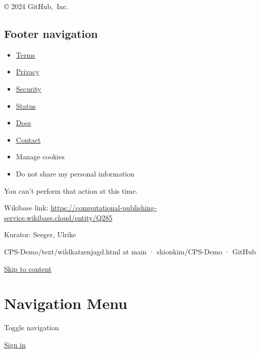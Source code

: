 \documentclass[
  letterpaper,
]{book}
\providecommand{\tightlist}{%
  \setlength{\itemsep}{0pt}\setlength{\parskip}{0pt}}\usepackage{longtable,booktabs,array}
\begin{document}
© 2024 GitHub,~Inc.

\subsection{Footer navigation}\label{footer-navigation-1}

\begin{itemize}
\tightlist
\item
  \href{https://docs.github.com/site-policy/github-terms/github-terms-of-service}{Terms}
\item
  \href{https://docs.github.com/site-policy/privacy-policies/github-privacy-statement}{Privacy}
\item
  \href{https://github.com/security}{Security}
\item
  \href{https://www.githubstatus.com/}{Status}
\item
  \href{https://docs.github.com/}{Docs}
\item
  \href{https://support.github.com?tags=dotcom-footer}{Contact}
\item
  Manage cookies
\item
  Do not share my personal information
\end{itemize}

You can't perform that action at this time.

Wikibase link:
\url{https://computational-publishing-service.wikibase.cloud/entity/Q285}

Kurator: Seeger, Ulrike

CPS-Demo/text/wildkatzenjagd.html at main · shionkim/CPS-Demo · GitHub

\hyperref[start-of-content]{Skip to content}

\section{Navigation Menu}\label{navigation-menu-2}

Toggle navigation

\href{./login?return_to=https\%3A\%2F\%2Fgithub.com\%2Fshionkim\%2FCPS-Demo\%2Fblob\%2Fmain\%2Ftext\%2Fwildkatzenjagd.html}{Sign
in}
\end{document}
